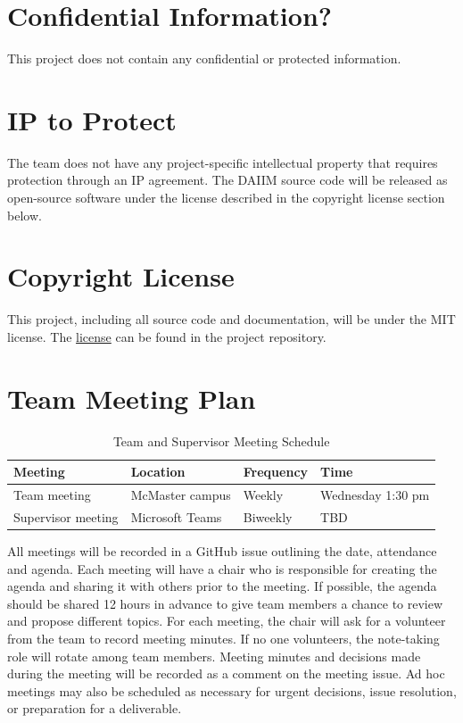 \documentclass{article}
\begin{document}
\section{Confidential Information?}
This project does not contain any confidential or protected information.
\section{IP to Protect}

The team does not have any project-specific intellectual property that requires protection through an IP agreement. The DAIIM source code will be released as open-source software under the license described in the copyright license section below.

\section{Copyright License}

This project, including all source code and documentation, will be under the MIT license. The \href{https://github.com/robertLam04/daiim/blob/main/LICENSE}{license} can be found in the project repository.

\section{Team Meeting Plan}

\begin{table}[hp]
\caption{Team and Supervisor Meeting Schedule} \label{TblMeetingSchedule}
\begin{tabularx}{\textwidth}{l>{\raggedright\arraybackslash}X>{\raggedright\arraybackslash}X>{\raggedright\arraybackslash}X}
\toprule
\textbf{Meeting} & \textbf{Location} & \textbf{Frequency} & \textbf{Time}\\
\midrule
Team meeting & McMaster campus & Weekly & Wednesday 1:30 pm\\
Supervisor meeting & Microsoft Teams & Biweekly & TBD\\
\bottomrule
\end{tabularx}
\end{table}

All meetings will be recorded in a GitHub issue outlining the date, attendance and agenda. Each meeting will have a chair who is responsible for creating the agenda and sharing it with others prior to the meeting. If possible, the agenda should be shared 12 hours in advance to give team members a chance to review and propose different topics. For each meeting, the chair will ask for a volunteer from the team to record meeting minutes. If no one volunteers, the note-taking role will rotate among team members. Meeting minutes and decisions made during the meeting will be recorded as a comment on the meeting issue. Ad hoc meetings may also be scheduled as necessary for urgent decisions, issue resolution, or preparation for a deliverable.
\end{document}
